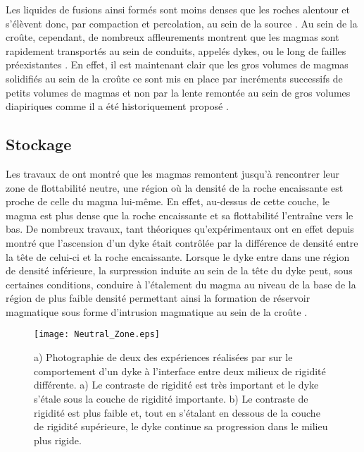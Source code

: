 Les liquides de fusions ainsi formés  sont moins denses que les roches
alentour et s'élèvent donc, par  compaction et percolation, au sein de
la  source  \citep{McKenzy:1984bo,McKenzie:1985jq}.   Au  sein  de  la
croûte, cependant,  de nombreux affleurements montrent  que les magmas
sont rapidement transportés au sein  de conduits, appelés dykes, ou le
long               de              failles               préexistantes
\citep{Clemens:1992kr,Petford:1993bk,Rubin:1995upa,Glazner:2004gv}. En
effet,  il  est  maintenant  clair  que les  gros  volumes  de  magmas
solidifiés au  sein de la croûte  ce sont mis en  place par incréments
successifs       de        petits       volumes        de       magmas
\citep{Annen:2002er,Glazner:2004gv,Michaut:2011kg} et non par la lente
remontée  au  sein   de  gros  volumes  diapiriques  comme   il  a  été
historiquement proposé \citep{Miller:1999km}.


\subsection{Stockage}
\label{C1-sec:stockage}

Les  travaux  de  \citet{Walker:1989jq}  ont  montré  que  les  magmas
remontent  jusqu'à rencontrer  leur zone  de flottabilité  neutre, une
région où  la densité de la  roche encaissante est proche  de celle du
magma lui-même. En effet, au-dessus de cette couche, le magma est plus
dense que la  roche encaissante et sa flottabilité  l'entraîne vers le
bas.        De      nombreux       travaux,      tant       théoriques
\citep{Lister:1991ut,Petford:1993bk,Rubin:1995upa}    qu'expérimentaux
\citep{Taisne:2009kj,Taisne:2011do}  ont en  effet  depuis montré  que
l'ascension d'un  dyke était  contrôlée par  la différence  de densité
entre la  tête de celui-ci  et la  roche encaissante. Lorsque  le dyke
entre dans une région de densité inférieure, la surpression induite au
sein de  la tête du dyke  peut, sous certaines conditions,  conduire à
l'étalement du magma au niveau de la  base de la région de plus faible
densité  permettant ainsi  la formation  de réservoir  magmatique sous
forme    d'intrusion    magmatique    au    sein    de    la    croûte
\citep{Taisne:2011do}.
\begin{figure}[h!]
  \begin{center}
    \graphicspath{ {/Users/thorey/Documents/These/Manuscript/Figure/Chapter1/} }
    \texttt{[image: Neutral\_Zone.eps]}
    \caption{a)  Photographie de  deux des  expériences réalisées  par
      \citet{Kavanagh:2006ig}   sur  le   comportement  d'un   dyke  à
      l'interface entre  deux milieux  de rigidité différente.   a) Le
      contraste de rigidité est très important et le dyke s'étale sous
      la couche de  rigidité importante.  b) Le  contraste de rigidité
      est plus faible et, tout en s'étalant en dessous de la couche de
      rigidité  supérieure, le  dyke continue  sa progression  dans le
      milieu plus rigide.}
    \label{C1-Neutral_Zone}
  \end{center}
\end{figure}

